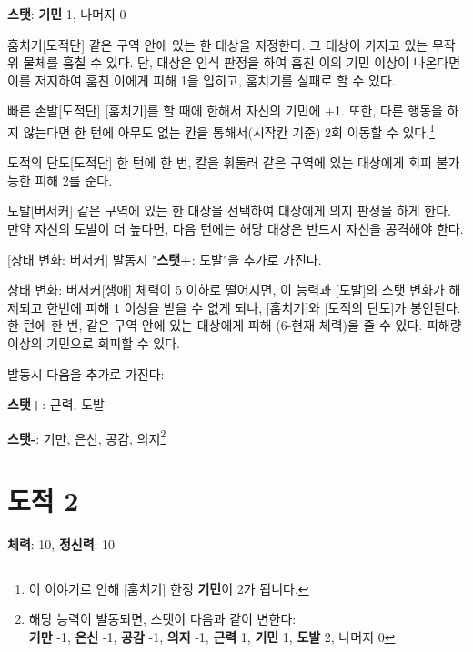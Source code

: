 \documentclass{report}
\begin{document}
	\textbf{스탯}: \textbf{기민} 1, 나머지 0
	
	\begin{spoiler}{훔치기}{[도적단]}
		같은 구역 안에 있는 한 대상을 지정한다. 그 대상이 가지고 있는 무작위 물체를 훔칠 수 있다. 단, 대상은 인식 판정을 하여 훔친 이의 기민 이상이 나온다면 이를 저지하여 훔친 이에게 피해 1을 입히고, 훔치기를 실패로 할 수 있다.
	\end{spoiler}
	
	\begin{spoiler}{빠른 손발}{[도적단]}
		[훔치기]를 할 때에 한해서 자신의 기민에 +1. 또한, 다른 행동을 하지 않는다면 한 턴에 아무도 없는 칸을 통해서(시작칸 기준) 2회 이동할 수 있다.\footnote{이 이야기로 인해 [훔치기] 한정 \textbf{기민}이 2가 됩니다.}
	\end{spoiler}
	
	\begin{spoiler}{도적의 단도}{[도적단]}
		한 턴에 한 번, 칼을 휘둘러 같은 구역에 있는 대상에게 회피 불가능한 피해 2를 준다.
	\end{spoiler}
	
	\begin{spoiler}{도발}{[버서커]}
		같은 구역에 있는 한 대상을 선택하여 대상에게 의지 판정을 하게 한다. 만약 자신의 도발이 더 높다면, 다음 턴에는 해당 대상은 반드시 자신을 공격해야 한다.
		
		[상태 변화: 버서커] 발동시 "\textbf{스탯+}: 도발"을 추가로 가진다.
	\end{spoiler}
	
	\begin{spoiler}{상태 변화: 버서커}{[생애]}
		체력이 5 이하로 떨어지면, 이 능력과 [도발]의 스탯 변화가 해제되고 한번에 피해 1 이상을 받을 수 없게 되나, [훔치기]와 [도적의 단도]가 봉인된다. 한 턴에 한 번, 같은 구역 안에 있는 대상에게 피해 (6-현재 체력)을 줄 수 있다. 피해량 이상의 기민으로 회피할 수 있다.
		
		발동시 다음을 추가로 가진다:
		
		\textbf{스탯+}: 근력, 도발
		
		\textbf{스탯-}: 기만, 은신, 공감, 의지\footnote{해당 능력이 발동되면, 스탯이 다음과 같이 변한다:\\ \textbf{기만} -1, \textbf{은신} -1, \textbf{공감} -1, \textbf{의지} -1, \textbf{근력} 1, \textbf{기민} 1, \textbf{도발} 2, 나머지 0}
	\end{spoiler}
	
	\section*{도적 2}
	\textbf{체력}: 10, \textbf{정신력}: 10
	
\end{document}
